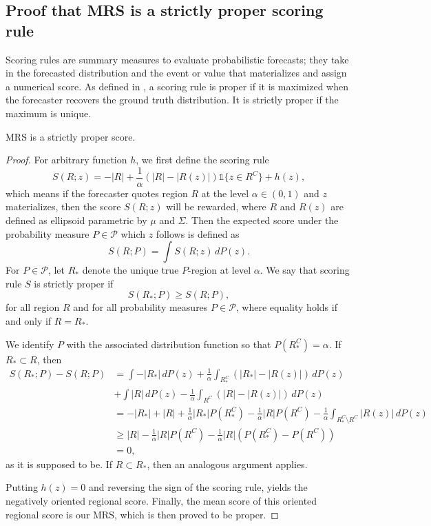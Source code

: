 \subsection{Proof that MRS is a strictly proper scoring rule}
\label{app:properscoring}

Scoring rules are summary measures to evaluate probabilistic forecasts; they take in the forecasted distribution and the event or value that materializes and assign a numerical score. As defined in \cite{properscoring},  a scoring rule is proper if it is maximized when the forecaster recovers the ground truth distribution. It is strictly proper if the maximum is unique.

\begin{prop*} 
MRS is a strictly proper score.
\end{prop*}
\begin{proof}
For arbitrary function $h$, we first define the scoring rule
\[
 S(R;z) = -|R| + \frac{1}{\alpha}(|R| - |R(z)|)\mathbb{1}\{z\in R^C\} + h(z),
\]
which means if the forecaster quotes region $R$ at the level $\alpha\in (0,1)$ and $z$ materializes, then the score $S(R;z)$ will be rewarded, where $R$ and $R(z)$ are defined as ellipsoid parametric by $\mu$ and $\Sigma$. Then the expected score under the probability measure $P\in \mathcal{P}$ which $z$ follows is defined as
\[
 S(R;P) = \int S(R;z) \, dP(z). 
\]
For $P\in \mathcal{P}$, let $R_*$ denote the unique true $P$-region at level $\alpha$. We say that scoring rule $S$ is strictly proper if 
\[
 S(R_*;P) \geq S(R;P),
\]
for all region $R$ and for all probability measures $P\in \mathcal{P}$, where equality holds if and only if $R = R_*$. 

We identify $P$ with the associated distribution function so that $P(R_*^C)=\alpha$. If $R_* \subset R$, then
\begin{align*}
    S(R_*;P) - S(R;P) & = \int -|R_*| \, dP(z) + \frac{1}{\alpha} \int_{R_*^C} (|R_*| - |R(z)|) \, dP(z) \\
    & + \int |R| \, dP(z) - \frac{1}{\alpha} \int_{R^C} (|R| - |R(z)|) \, dP(z) \\
    & = -|R_*| + |R| + \frac{1}{\alpha}|R_*|P(R_*^C) - \frac{1}{\alpha}|R|P(R^C) - \frac{1}{\alpha}\int _{R_*^C \setminus R^C} |R(z)| \, dP(z) \\
    & \geq |R| - \frac{1}{\alpha}|R|P(R^C) - \frac{1}{\alpha}|R|(P(R_*^C)-P(R^C)) \\
    & = 0, 
\end{align*}
as it is supposed to be. If $R \subset R_*$, then an analogous argument applies. 

Putting $h(z) = 0$ and reversing the sign of the scoring rule, yields the negatively oriented regional score. Finally, the mean score of this oriented regional score is our MRS, which is then proved to be proper.
\end{proof}


